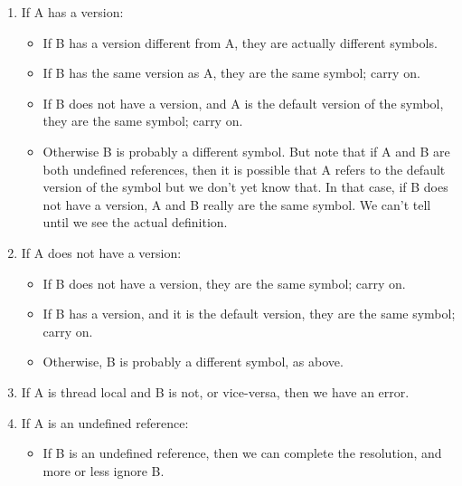 \begin{enumerate}
    \item If A has a version:

        \begin{itemize}
            \item If B has a version different from A, they are actually
                  different symbols.

            \item If B has the same version as A, they are the same symbol;
                  carry on.

            \item If B does not have a version, and A is the default version of
                  the symbol, they are the same symbol; carry on.
            \item Otherwise B is probably a different symbol.  But note that if
                  A and B are both undefined references, then it is possible
                  that A refers to the default version of the symbol but we
                  don't yet know that.  In that case, if B does not have a
                  version, A and B really are the same symbol.  We can't tell
                  until we see the actual definition.
        \end{itemize}

    \item If A does not have a version:

        \begin{itemize}
            \item If B does not have a version, they are the same symbol; carry
                  on.

            \item If B has a version, and it is the default version, they are
                  the same symbol; carry on.

            \item Otherwise, B is probably a different symbol, as above.
        \end{itemize}

    \item If A is thread local and B is not, or vice-versa, then we have an
          error.

    \item If A is an undefined reference:

        \begin{itemize}
            \item If B is an undefined reference, then we can complete the
                  resolution, and more or less ignore B.


\end{itemize}
\end{enumerate}
